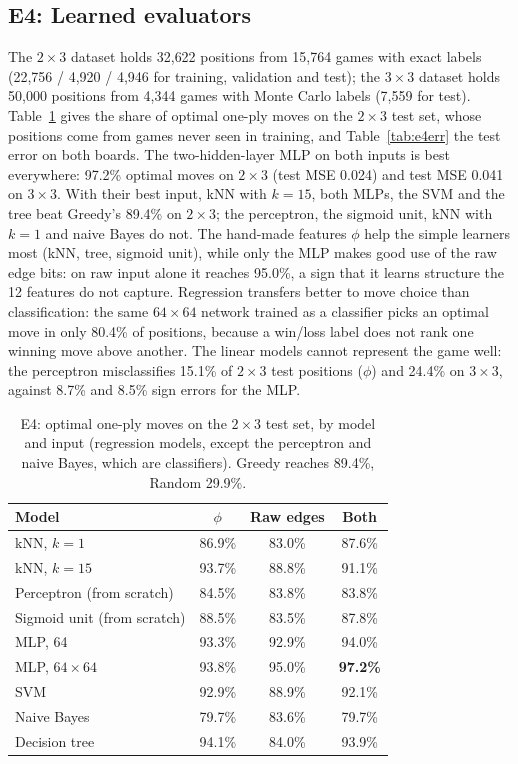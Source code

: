 \documentclass[11pt,a4paper]{article}
\newcommand{\bd}[2]{$#1{\times}#2$}            %
\begin{document}
\FloatBarrier
\subsection{E4: Learned evaluators}

The \bd{2}{3} dataset holds 32{,}622 positions from 15{,}764 games with exact labels
(22{,}756 / 4{,}920 / 4{,}946 for training, validation and test); the \bd{3}{3} dataset holds
50{,}000 positions from 4{,}344 games with Monte Carlo labels (7{,}559 for test).
Table~\ref{tab:e4opt} gives the share of optimal one-ply moves on the \bd{2}{3} test set,
whose positions come from games never seen in training, and Table~\ref{tab:e4err} the
test error on both boards. The two-hidden-layer MLP on both inputs is best everywhere: 97.2\% optimal
moves on \bd{2}{3} (test MSE 0.024) and test MSE 0.041 on \bd{3}{3}. With their best input,
kNN with $k=15$, both MLPs, the SVM and the tree beat Greedy's 89.4\% on \bd{2}{3}; the
perceptron, the sigmoid unit, kNN with $k=1$ and naive Bayes do not. The
hand-made features $\phi$ help the simple learners most (kNN, tree, sigmoid unit), while
only the MLP makes good use of the raw edge bits: on raw input alone it reaches 95.0\%, a
sign that it learns structure the 12 features do not capture. Regression transfers better
to move choice than classification: the same $64{\times}64$ network trained as a classifier
picks an optimal move in only 80.4\% of positions, because a win/loss label does not rank
one winning move above another. The linear models cannot
represent the game well: the perceptron misclassifies 15.1\% of \bd{2}{3} test positions
($\phi$) and 24.4\% on \bd{3}{3}, against 8.7\% and 8.5\% sign errors for the MLP.

\begin{table}[htbp]
\centering
\caption{E4: optimal one-ply moves on the \bd{2}{3} test set, by model and input
(regression models, except the perceptron and naive Bayes, which are classifiers).
Greedy reaches 89.4\%, Random 29.9\%.}
\label{tab:e4opt}
\begin{tabular}{lccc}
\toprule
Model & $\phi$ & Raw edges & Both \\
\midrule
kNN, $k=1$ & 86.9\% & 83.0\% & 87.6\% \\
kNN, $k=15$ & 93.7\% & 88.8\% & 91.1\% \\
Perceptron (from scratch) & 84.5\% & 83.8\% & 83.8\% \\
Sigmoid unit (from scratch) & 88.5\% & 83.5\% & 87.8\% \\
MLP, 64 & 93.3\% & 92.9\% & 94.0\% \\
MLP, $64{\times}64$ & 93.8\% & 95.0\% & \textbf{97.2\%} \\
SVM & 92.9\% & 88.9\% & 92.1\% \\
Naive Bayes & 79.7\% & 83.6\% & 79.7\% \\
Decision tree & 94.1\% & 84.0\% & 93.9\% \\
\bottomrule
\end{tabular}
\end{table}
\end{document}
